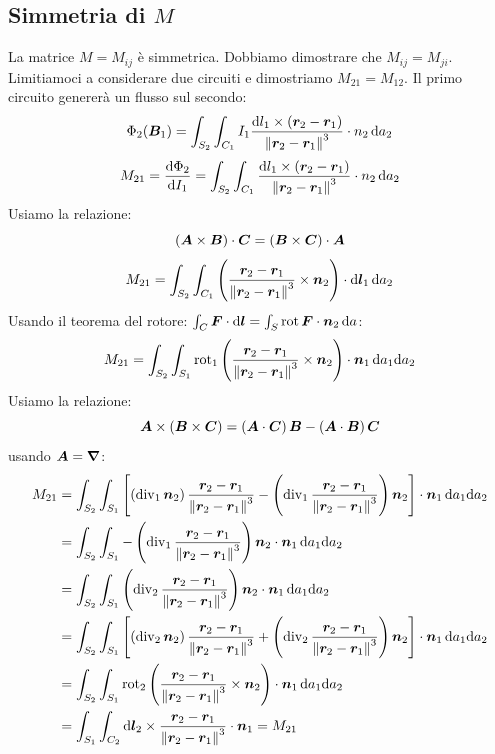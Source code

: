 \subsection{Simmetria di \texorpdfstring{$M$}{M}}
La matrice $M=M_{ij}$ è simmetrica. Dobbiamo dimostrare che $M_{ij}=M_{ji}$. Limitiamoci a considerare due circuiti e dimostriamo $M_{21}=M_{12}$. Il primo circuito genererà un flusso sul secondo:
\begin{equation}
  \Phi_2(\ve B_1)=\int_{S_2}\int_{C_1}I_1\frac{\ud l_1\times\left(\ve r_2-\ve r_1\right)}{\norm{\ve r_2-\ve r_1}^3}\cdot n_2\,\ud a_2
\end{equation}
\begin{equation}
  M_{21}=\frac{\ud\Phi_2}{\ud I_1}=\int_{S_2}\int_{C_1}\frac{\ud l_1\times\left(\ve r_2-\ve r_1\right)}{\norm{\ve r_2-\ve r_1}^3}\cdot n_2\,\ud a_2
\end{equation}
Usiamo la relazione:
\begin{equation}
  \left(\ve A\times\ve B\right)\cdot\ve C=\left(\ve B\times \ve C\right)\cdot\ve A
\end{equation}
\begin{equation}
  M_{21}=\int_{S_2}\int_{C_1}\left(\frac{\ve r_2-\ve r_1}{\norm{\ve r_2-\ve r_1}^3}\times\ve n_2\right)\cdot\ud\ve l_1\,\ud a_2
\end{equation}
Usando il teorema del rotore: $\int_C\ve F\cdot\ud \ve l=\int_S\rot\ve F\cdot\ve n_2\,\ud a$:
\begin{equation}
  M_{21}=\int_{S_2}\int_{S_1}\rot_1\left(\frac{\ve r_2-\ve r_1}{\norm{\ve r_2-\ve r_1}^3}\times \ve n_2\right)\cdot\ve n_1\,\ud a_1\ud a_2
\end{equation}
Usiamo la relazione:
\begin{equation}
  \ve A\times\left(\ve B\times\ve C\right)=\left(\ve A\cdot\ve C\right)\ve B-\left(\ve A\cdot\ve B\right)\ve C
\end{equation}
usando $\ve A=\ve\nabla$:
\begin{equation}
  \begin{split}
    M_{21}&=\int_{S_2}\int_{S_1}\left[\left(\diver_1\ve n_2\right)\frac{\ve r_2-\ve r_1}{\norm{\ve r_2-\ve r_1}^3}-\left(\diver_1 \frac{\ve r_2-\ve r_1}{\norm{\ve r_2-\ve r_1}^3}\right)\ve n_2\right]\cdot\ve n_1\,\ud a_1\ud a_2\\
    &=\int_{S_2}\int_{S_1}-\left(\diver_1 \frac{\ve r_2-\ve r_1}{\norm{\ve r_2-\ve r_1}^3}\right)\ve n_2\cdot\ve n_1\,\ud a_1\ud a_2\\
    &=\int_{S_2}\int_{S_1}\left(\diver_2 \frac{\ve r_2-\ve r_1}{\norm{\ve r_2-\ve r_1}^3}\right)\ve n_2\cdot\ve n_1\,\ud a_1\ud a_2\\
    &=\int_{S_2}\int_{S_1}\left[\left(\diver_2\ve n_2\right)\frac{\ve r_2-\ve r_1}{\norm{\ve r_2-\ve r_1}^3}+\left(\diver_2 \frac{\ve r_2-\ve r_1}{\norm{\ve r_2-\ve r_1}^3}\right)\ve n_2\right]\cdot\ve n_1\,\ud a_1\ud a_2\\
    &=\int_{S_2}\int_{S_1}\rot_2\left(\frac{\ve r_2-\ve r_1}{\norm{\ve r_2-\ve r_1}^3}\times \ve n_2\right)\cdot\ve n_1\,\ud a_1\ud a_2\\
    &=\int_{S_1}\int_{C_2}\ud\ve l_2\times\frac{\ve r_2-\ve r_1}{\norm{\ve r_2-\ve r_1}^3}\cdot \ve n_1=M_{21}
  \end{split}
\end{equation}

